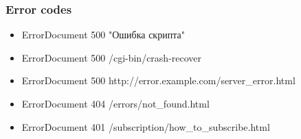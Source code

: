\begin{frame}[fragile]
        \frametitle{Error codes}
\begin{itemize}
    \item ErrorDocument 500 "Ошибка скрипта"
    \item ErrorDocument 500 /cgi-bin/crash-recover
    \item ErrorDocument 500 http://error.example.com/server\_error.html
    \item ErrorDocument 404 /errors/not\_found.html 
    \item ErrorDocument 401 /subscription/how\_to\_subscribe.html
\end{itemize}
\end{frame}
